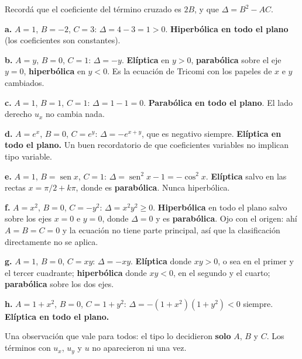 \documentclass[
  spanish,
  a4paper,
]{scrbook}
\theoremstyle{definition}
\theoremstyle{plain}
\theoremstyle{definition}
\theoremstyle{plain}
\theoremstyle{definition}
\theoremstyle{remark}
\begin{document}
\begin{tcolorbox}[enhanced jigsaw, arc=.35mm, bottomrule=.15mm, bottomtitle=1mm, breakable, colback=white, colbacktitle=quarto-callout-tip-color!10!white, colframe=quarto-callout-tip-color-frame, coltitle=black, left=2mm, leftrule=.75mm, opacityback=0, opacitybacktitle=0.6, rightrule=.15mm, title=\textcolor{quarto-callout-tip-color}{\faLightbulb}\hspace{0.5em}{Solución}, titlerule=0mm, toprule=.15mm, toptitle=1mm]

Recordá que el coeficiente del término cruzado es \(2B\), y que
\(\Delta = B^2-AC\).

\textbf{a.} \(A=1\), \(B=-2\), \(C=3\): \(\Delta = 4-3 = 1 > 0\).
\textbf{Hiperbólica en todo el plano} (los coeficientes son constantes).

\textbf{b.} \(A=y\), \(B=0\), \(C=1\): \(\Delta = -y\).
\textbf{Elíptica} en \(y>0\), \textbf{parabólica} sobre el eje \(y=0\),
\textbf{hiperbólica} en \(y<0\). Es la ecuación de Tricomi con los
papeles de \(x\) e \(y\) cambiados.

\textbf{c.} \(A=1\), \(B=1\), \(C=1\): \(\Delta = 1-1 = 0\).
\textbf{Parabólica en todo el plano}. El lado derecho \(u_x\) no cambia
nada.

\textbf{d.} \(A=e^{x}\), \(B=0\), \(C=e^{y}\): \(\Delta = -e^{x+y}\),
que es negativo siempre. \textbf{Elíptica en todo el plano.} Un buen
recordatorio de que coeficientes variables no implican tipo variable.

\textbf{e.} \(A=1\), \(B=\operatorname{sen}x\), \(C=1\):
\(\Delta = \operatorname{sen}^2x - 1 = -\cos^2x\). \textbf{Elíptica}
salvo en las rectas \(x = \pi/2 + k\pi\), donde es \textbf{parabólica}.
Nunca hiperbólica.

\textbf{f.} \(A=x^2\), \(B=0\), \(C=-y^2\): \(\Delta = x^2y^2 \ge 0\).
\textbf{Hiperbólica} en todo el plano salvo sobre los ejes \(x=0\) e
\(y=0\), donde \(\Delta=0\) y es \textbf{parabólica}. Ojo con el origen:
ahí \(A=B=C=0\) y la ecuación no tiene parte principal, así que la
clasificación directamente no se aplica.

\textbf{g.} \(A=1\), \(B=0\), \(C=xy\): \(\Delta = -xy\).
\textbf{Elíptica} donde \(xy>0\), o sea en el primer y el tercer
cuadrante; \textbf{hiperbólica} donde \(xy<0\), en el segundo y el
cuarto; \textbf{parabólica} sobre los dos ejes.

\textbf{h.} \(A=1+x^2\), \(B=0\), \(C=1+y^2\):
\(\Delta = -(1+x^2)(1+y^2) < 0\) siempre. \textbf{Elíptica en todo el
plano.}

Una observación que vale para todos: el tipo lo decidieron \textbf{solo}
\(A\), \(B\) y \(C\). Los términos con \(u_x\), \(u_y\) y \(u\) no
aparecieron ni una vez.

\end{tcolorbox}
\end{document}
